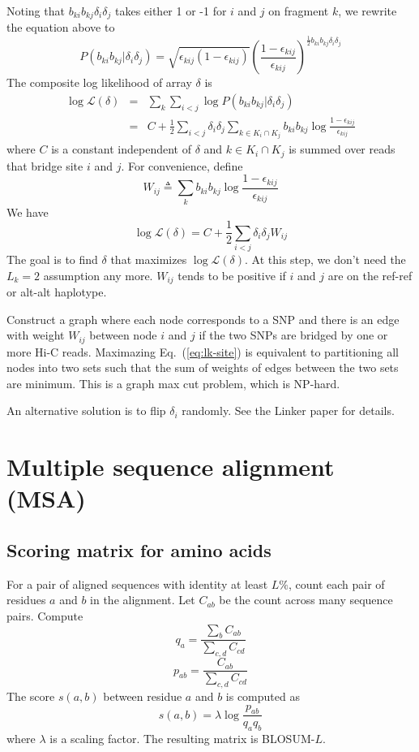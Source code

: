 \documentclass[10pt]{article}
\begin{document}
Noting that $b_{ki}b_{kj}\delta_i\delta_j$ takes either 1 or -1 for $i$ and $j$ on fragment
$k$, we rewrite the equation above to
$$
P(b_{ki}b_{kj}|\delta_i\delta_j)=\sqrt{\epsilon_{kij}(1-\epsilon_{kij})}\left(\frac{1-\epsilon_{kij}}{\epsilon_{kij}}\right)^{\frac{1}{2}b_{ki}b_{kj}\delta_i\delta_j}
$$
The composite log likelihood of array $\delta$ is
\begin{eqnarray*}
\log\mathcal{L}(\delta)
&=&\sum_k\sum_{i<j}\log P(b_{ki}b_{kj}|\delta_i\delta_j)\\
&=&C+\frac{1}{2}\sum_{i<j}\delta_i\delta_j\sum_{k\in K_i\cap K_j}b_{ki}b_{kj}\log\frac{1-\epsilon_{kij}}{\epsilon_{kij}}
\end{eqnarray*}
where $C$ is a constant independent of $\delta$ and $k\in K_i\cap K_j$ is
summed over reads that bridge site $i$ and $j$. For convenience, define
$$
W_{ij}\triangleq\sum_kb_{ki}b_{kj}\log\frac{1-\epsilon_{kij}}{\epsilon_{kij}}
$$
We have
\begin{equation}\label{eq:lk-site}
\log\mathcal{L}(\delta)=C+\frac{1}{2}\sum_{i<j}\delta_i\delta_jW_{ij}
\end{equation}
The goal is to find $\delta$ that maximizes $\log\mathcal{L}(\delta)$. At this
step, we don't need the $L_k=2$ assumption any more. $W_{ij}$ tends to be
positive if $i$ and $j$ are on the ref-ref or alt-alt haplotype.

Construct a graph where each node corresponds to a SNP and there is an edge
with weight $W_{ij}$ between node $i$ and $j$ if the two SNPs are bridged by
one or more Hi-C reads. Maximazing Eq.~(\ref{eq:lk-site}) is equivalent to
partitioning all nodes into two sets such that the sum of weights of edges
between the two sets are minimum. This is a graph max cut problem, which is
NP-hard.

An alternative solution is to flip $\delta_i$ randomly. See the Linker paper
for details.

\newpage

\section{Multiple sequence alignment (MSA)}

\subsection{Scoring matrix for amino acids}

For a pair of aligned sequences with identity at least $L\%$, count each pair of
residues $a$ and $b$ in the alignment. Let $C_{ab}$ be the count across many
sequence pairs. Compute
$$
q_a=\frac{\sum_b C_{ab}}{\sum_{c,d}C_{cd}}
$$
$$
p_{ab}=\frac{C_{ab}}{\sum_{c,d}C_{cd}}
$$
The score $s(a,b)$ between residue $a$ and $b$ is computed as
$$
s(a,b)=\lambda\log\frac{p_{ab}}{q_aq_b}
$$
where $\lambda$ is a scaling factor. The resulting matrix is BLOSUM-$L$.
\end{document}
